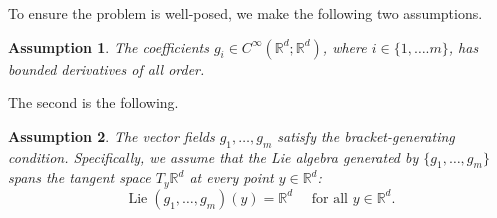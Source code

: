 \documentclass{amsart}
\newtheorem{assumption}{Assumption}
\numberwithin{equation}{section}
\begin{document}
To ensure the problem is well-posed, we make the following two assumptions.
\begin{assumption}\label{ass:wellposed}
The coefficients $g_i \in C^\infty(\mathbb{R}^d; \mathbb{R}^d)$, where $i\in\{1,\dots.m\}$, has bounded derivatives of all order. 
\end{assumption}
The second is the following.
\begin{assumption}\label{ass:Controllability condition}
The vector fields ${g_1, \dots, g_m}$ satisfy the bracket-generating condition. Specifically, we assume that the Lie algebra generated by $\{g_1, \dots, g_m\}$ spans the tangent space $T_y\mathbb{R}^d$ at every point $y \in \mathbb{R}^d$:
\[
\operatorname{Lie}(g_1, \dots, g_m)(y) = \mathbb{R}^d \quad \text{ for all $y \in \mathbb{R}^d$.}
\]
\end{assumption}
\end{document}
